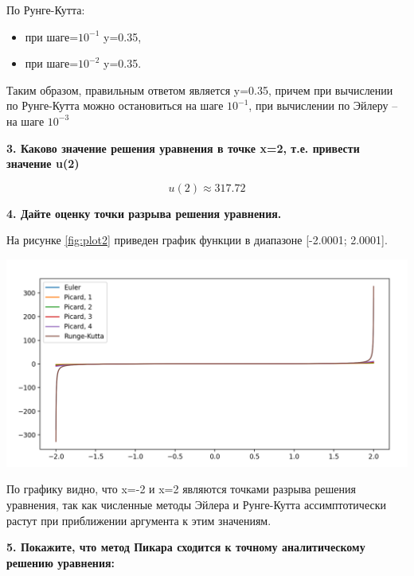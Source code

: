 \documentclass[12pt]{report}
\begin{document}
По Рунге-Кутта: 
\begin{itemize}
	\item при шаге=$10^{-1}$ y=0.35, 
	\item при шаге=$10^{-2}$ y=0.35. 
\end{itemize}

Таким образом, правильным ответом является y=0.35, причем при вычислении по Рунге-Кутта можно остановиться на шаге $10^{-1}$, при вычислении по Эйлеру -- на шаге $10^{-3}$

\textbf{3.  Каково значение решения уравнения в точке x=2, т.е. привести значение u(2)}


\begin{equation}
	u(2) \approx 317.72
\end{equation}

\textbf{4. Дайте оценку точки разрыва решения уравнения.}

На рисунке \ref{fig:plot2} приведен график функции в диапазоне [-2.0001; 2.0001].

\includegraphics[scale=0.6]{img/plot2}\label{fig:plot2}

По графику видно, что x=-2 и x=2 являются точками разрыва решения уравнения, так как численные методы Эйлера и Рунге-Кутта ассимптотически растут при приближении аргумента к этим значениям.

\textbf{5. Покажите, что метод Пикара сходится к точному аналитическому решению уравнения:}
\end{document}
